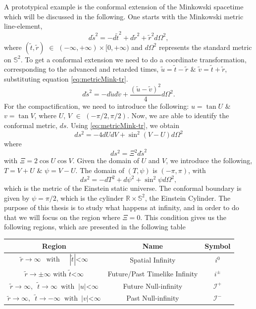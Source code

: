 A prototypical example is the conformal extension of the Minkowski spacetime which will be discussed in the following.  One starts with the Minkowski metric line-element,
\begin{equation}\label{eq:metricMink-tr}
	d \tilde{s}^2=-d \tilde{t}^2+d \tilde{r}^2+\tilde{r}^2 d
        \Omega^2,
\end{equation}
where $(\tilde{t}, \tilde{r})$ $\in$ $(-\infty,+\infty) \times[0,+\infty)$ and $d \Omega^2$ represents the standard metric on $\mathbb{S}^2$. To get a conformal extension we need to do a coordinate transformation, corresponding to the advanced and retarded  times, $\tilde{u}=\tilde{t}-\tilde{r}$ $\&$ $\tilde{v}=\tilde{t}+\tilde{r}$,  substituting equation \eqref{eq:metricMink-tr}.
\begin{equation}\label{eq:metricMink-tr1}
	d \tilde{s}^2=-d \tilde{u} d \tilde{v}+\frac{(\tilde{u}-\tilde{v})^2}{4} d \Omega^2.
\end{equation}
For the compactification, we need to introduce the following: $u = \tan U$ $\&$ $v = \tan V$, where $U$, $V$ $\in$ $(- \pi/2, \pi/2)$. Now, we are able to identify the conformal metric,
$ds$. Using \eqref{eq:metricMink-tr}, we obtain
$$d s^2=-4 d U d V+\sin ^2(V-U) d \Omega^2$$ where
$$d s^2=\Xi^2 d \tilde{s}^2$$
with $\Xi=2 \cos U \cos V$. Given the
domain of $U$ and $V$, we introduce the following, $T=V+U$ $\&$ $\psi=V-U$. The domain of $(T, \psi)$ is $(-\pi, \pi)$, with
\begin{equation}\label{eq:metricMink-cf}
	d s^2=-d T^2+d \psi^2+\sin ^2 \psi d \Omega^2,
\end{equation}
which is the metric of the Einstein static universe. The conformal boundary is given by $\psi = \pi/2$, which is the cylinder $\mathbb{R} \times \mathbb{S}^2$, the Einstein Cylinder. The purpose of this thesis is  to study what happens at infinity, and in order to do that we will focus on the region where $\Xi = 0$. This condition gives us the following regions, which are presented in the following table
\begin{center}
    \begin{tabular}{ |c|c|c| }
      \hline
      Region & Name & Symbol \\
     \hline
     $\tilde{r} \rightarrow \infty \enspace \;  \text{with} \; \;\;\;\;
     |\tilde{t}| $<$ \infty$ & Spatial Infinity & $i^{0}$ \\
     \hline 
     $\tilde{r} \rightarrow \pm \infty$  \;\; with \;\; $\tilde{t}$<$\infty$
     \enspace & Future/Past Timelike Infinity & $i^{\pm}$ \\
     \hline
     $\tilde{r} \rightarrow \infty, \enspace \tilde{t} \rightarrow \infty \enspace
     \text{with} \;\; |u|$<$\infty$ &  Future Null-infinity & $\mathscr{I}^+$ \\ 
     \hline
     $\tilde{r} \rightarrow\infty, \enspace \tilde{t} \rightarrow-\infty \;\;
     \text{with} \enspace |v|$<$\infty$ & Past Null-infinity & $\mathscr{I}^-$ \\
     \hline
    \end{tabular}
    \end{center}

